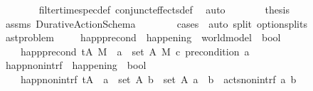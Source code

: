 \begin{isabellebody}
\ \ \ \ \ \ \isamarkupfalse%
\ filter{\isacharunderscore}{\kern0pt}time{\isacharunderscore}{\kern0pt}spec{\isacharunderscore}{\kern0pt}def\ conjunct{\isacharunderscore}{\kern0pt}effects{\isacharunderscore}{\kern0pt}def\ \isamarkupfalse%
\ auto\isanewline
\ \ \ \ \isamarkupfalse%
\ \isamarkupfalse%
\ {\isacharquery}{\kern0pt}thesis\ \isanewline
\ \ \ \ \ \ \isamarkupfalse%
\ assms\ Durative{\isacharunderscore}{\kern0pt}Action{\isacharunderscore}{\kern0pt}Schema\isanewline
\ \ \ \ \ \ \isamarkupfalse%
\ {\isacharparenleft}{\kern0pt}cases\ {\isasympi}{\isacharparenright}{\kern0pt}\ {\isacharparenleft}{\kern0pt}auto\ split{\isacharcolon}{\kern0pt}\ option{\isachardot}{\kern0pt}splits{\isacharparenright}{\kern0pt}\ \isanewline
\ \ \isamarkupfalse%
%
\endisatagproof
{\isafoldproof}%
%
\isadelimproof
\isanewline
%
\endisadelimproof
\ \ \isanewline
{}\isamarkupfalse%
\ %
%
\isadelimdocument
%
\endisadelimdocument
%
\isatagdocument
%
\isamarkuptrue%
%
\endisatagdocument
{\isafolddocument}%
%
\isadelimdocument
%
\endisadelimdocument
{}\isamarkupfalse%
\ ast{\isacharunderscore}{\kern0pt}problem\ \isanewline
\isanewline
\ \ \isamarkupfalse%
\ happ{\isacharunderscore}{\kern0pt}precond\ {\isacharcolon}{\kern0pt}{\isacharcolon}{\kern0pt}\ {\isachardoublequoteopen}happening\ {\isasymRightarrow}\ world{\isacharunderscore}{\kern0pt}model\ {\isasymRightarrow}\ bool{\isachardoublequoteclose}\ \isanewline
\ \ \ \ {\isachardoublequoteopen}happ{\isacharunderscore}{\kern0pt}precond\ {\isacharparenleft}{\kern0pt}t{\isacharcomma}{\kern0pt}A{\isacharparenright}{\kern0pt}\ M\ {\isasymlongleftrightarrow}\ {\isacharparenleft}{\kern0pt}{\isasymforall}a\ {\isasymin}\ set\ A{\isachardot}{\kern0pt}\ M\ \isactrlsup c{\isasymTTurnstile}\isactrlsub {\isacharequal}{\kern0pt}\ precondition\ a{\isacharparenright}{\kern0pt}{\isachardoublequoteclose}\isanewline
\isanewline
\ \ \isamarkupfalse%
\ happ{\isacharunderscore}{\kern0pt}non{\isacharunderscore}{\kern0pt}intrf\ {\isacharcolon}{\kern0pt}{\isacharcolon}{\kern0pt}\ {\isachardoublequoteopen}happening\ {\isasymRightarrow}\ bool{\isachardoublequoteclose}\ \isanewline
\ \ \ \ {\isachardoublequoteopen}happ{\isacharunderscore}{\kern0pt}non{\isacharunderscore}{\kern0pt}intrf\ {\isacharparenleft}{\kern0pt}t{\isacharcomma}{\kern0pt}A{\isacharparenright}{\kern0pt}\ {\isasymlongleftrightarrow}\ {\isacharparenleft}{\kern0pt}{\isasymforall}a\ {\isasymin}\ set\ A{\isachardot}{\kern0pt}\ {\isasymforall}b\ {\isasymin}\ set\ A{\isachardot}{\kern0pt}\ a\ {\isasymnoteq}\ b\ {\isasymlongrightarrow}\ acts{\isacharunderscore}{\kern0pt}non{\isacharunderscore}{\kern0pt}intrf\ a\ b{\isacharparenright}{\kern0pt}{\isachardoublequoteclose}%

\end{isabellebody}
